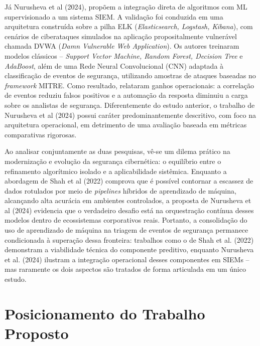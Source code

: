 Já Nurusheva et al (2024), propõem a integração direta de algoritmos com ML supervisionado a um sistema \gls{SIEM}. 
A validação foi conduzida em uma arquitetura construída sobre a pilha ELK (\textit{Elasticsearch, Logstash, Kibana}),
com cenários de ciberataques simulados na aplicação propositalmente vulnerável chamada DVWA (\textit{Damn Vulnerable Web Application}).
Os autores treinaram modelos clássicos -- \textit{Support Vector Machine, Random Forest, Decision Tree} e \textit{AdaBoost}, 
além de uma Rede Neural Convolucional (CNN) adaptada à classificação de eventos de segurança, 
utilizando amostras de ataques baseadas no \textit{framework} \gls{MITRE}.
Como resultado, relataram ganhos operacionais: a correlação de eventos reduziu falsos positivos e a automação da resposta diminuiu a carga sobre os analistas de segurança. 
Diferentemente do estudo anterior, o trabalho de Nurusheva et al (2024) possui caráter predominantemente descritivo, 
com foco na arquitetura operacional, em detrimento de uma avaliação baseada em métricas comparativas rigorosas.

Ao analisar conjuntamente as duas pesquisas, vê-se um dilema prático na modernização e evolução da segurança cibernética: 
o equilíbrio entre o refinamento algorítmico isolado e a aplicabilidade sistêmica. 
Enquanto a abordagem de Shah et al (2022) comprova que é possível contornar a escassez de dados rotulados por meio de \textit{pipelines} híbridos de aprendizado de máquina, 
alcançando alta acurácia em ambientes controlados, a proposta de Nurusheva et al (2024) evidencia que o verdadeiro desafio está na orquestração contínua desses modelos dentro de ecossistemas corporativos reais. 
Portanto, a consolidação do uso de aprendizado de máquina na triagem de eventos de segurança permanece condicionada à superação dessa fronteira: 
trabalhos como o de Shah et al. (2022) demonstram a viabilidade técnica do componente preditivo, enquanto Nurusheva et al. (2024) ilustram a integração operacional desses componentes em \gls{SIEM}s -- mas raramente os dois aspectos são tratados de forma articulada em um único estudo.


\section{Posicionamento do Trabalho Proposto}

